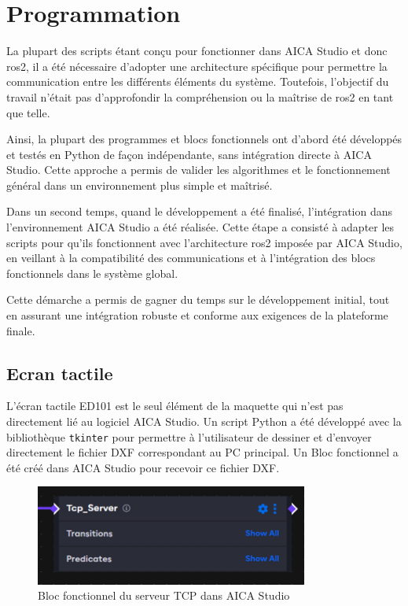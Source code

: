 \chapter{Programmation}
\label{chap:programmation}

La plupart des scripts étant conçu pour fonctionner dans AICA Studio et donc \gls{ros2}, il a été nécessaire d'adopter une architecture spécifique pour permettre la communication entre les différents éléments du système. Toutefois, l'objectif du travail n'était pas d'approfondir la compréhension ou la maîtrise de \gls{ros2} en tant que telle.

Ainsi, la plupart des programmes et blocs fonctionnels ont d'abord été développés et testés en Python de façon indépendante, sans intégration directe à AICA Studio. Cette approche a permis de valider les algorithmes et le fonctionnement général dans un environnement plus simple et maîtrisé.

Dans un second temps, quand le développement a été finalisé, l'intégration dans l'environnement AICA Studio a été réalisée. Cette étape a consisté à adapter les scripts pour qu'ils fonctionnent avec l'architecture \gls{ros2} imposée par AICA Studio, en veillant à la compatibilité des communications et à l'intégration des blocs fonctionnels dans le système global.

Cette démarche a permis de gagner du temps sur le développement initial, tout en assurant une intégration robuste et conforme aux exigences de la plateforme finale.

\section{Ecran tactile}
L'écran tactile ED101 est le seul élément de la maquette qui n'est pas directement lié au logiciel AICA Studio. Un script Python a été développé avec la bibliothèque \texttt{tkinter} pour permettre à l'utilisateur de dessiner et d'envoyer directement le fichier DXF correspondant au PC principal. Un Bloc fonctionnel a été créé dans AICA Studio pour recevoir ce fichier DXF.

\begin{figure}[H]
    \centering
    \includegraphics[width=0.8\textwidth]{assets/figures/AICA_Tcp_Server.png}
    \caption{Bloc fonctionnel du serveur TCP dans AICA Studio}
    \label{fig:touchscreen_interface}
\end{figure}

